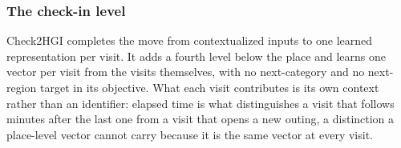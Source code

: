 \subsubsection{The check-in level}


Check2HGI completes the move from contextualized inputs to one learned representation
per visit. It adds a fourth level below the place and learns one vector per visit from
the visits themselves, with no next-category and no next-region target in its
objective. What each visit contributes is its own context rather than an identifier: elapsed time
is what distinguishes a visit that follows minutes after the last one from a visit that opens a new
outing, a distinction a place-level vector cannot carry because it is the same vector at every
visit.

